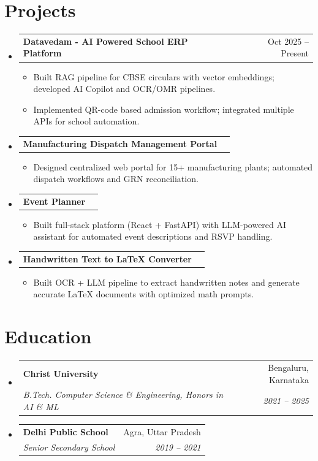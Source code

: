 \documentclass[letterpaper,10pt]{article}
\makeatletter
\newcommand{\resumeItem}[1]{
  \item\small{
    {#1 \vspace{-1pt}}
  }
}
\newcommand{\resumeSubheading}[4]{
  \vspace{-1pt}\item
    \begin{tabular*}{0.97\textwidth}[t]{l@{\extracolsep{\fill}}r}
      \textbf{#1} & #2 \\
      \textit{\small #3} & \textit{\small #4} \\
    \end{tabular*}\vspace{-5pt}
}
\newcommand{\resumeProjectHeading}[2]{
    \item
    \begin{tabular*}{0.97\textwidth}{l@{\extracolsep{\fill}}r}
      \small#1 & #2 \\
    \end{tabular*}\vspace{-1pt}
}
\newcommand{\resumeSubHeadingListStart}{\begin{itemize}[leftmargin=0.15in, label={}]}
\newcommand{\resumeSubHeadingListEnd}{\end{itemize}\vspace{-5pt}}
\newcommand{\resumeItemListStart}{\begin{itemize}\vspace{-3pt}}
\newcommand{\resumeItemListEnd}{\end{itemize}\vspace{-2pt}}
\makeatother
\begin{document}
\section{Projects}
\resumeSubHeadingListStart
    \resumeProjectHeading
      {\textbf{Datavedam - AI Powered School ERP Platform}}{Oct 2025 -- Present}
      \resumeItemListStart
        \resumeItem{Built RAG pipeline for CBSE circulars with vector embeddings; developed AI Copilot and OCR/OMR pipelines.}
        \resumeItem{Implemented QR-code based admission workflow; integrated multiple APIs for school automation.}
      \resumeItemListEnd
    \resumeProjectHeading
      {\textbf{Manufacturing Dispatch Management Portal}}{}
      \resumeItemListStart
        \resumeItem{Designed centralized web portal for 15+ manufacturing plants; automated dispatch workflows and GRN reconciliation.}
      \resumeItemListEnd
    \resumeProjectHeading
      {\textbf{Event Planner}}{}
      \resumeItemListStart
        \resumeItem{Built full-stack platform (React + FastAPI) with LLM-powered AI assistant for automated event descriptions and RSVP handling.}
      \resumeItemListEnd
    \resumeProjectHeading
      {\textbf{Handwritten Text to LaTeX Converter}}{}
      \resumeItemListStart
        \resumeItem{Built OCR + LLM pipeline to extract handwritten notes and generate accurate LaTeX documents with optimized math prompts.}
      \resumeItemListEnd
\resumeSubHeadingListEnd

\section{Education}
\resumeSubHeadingListStart
    \resumeSubheading
      {Christ University}{Bengaluru, Karnataka}
      {B.Tech. Computer Science \& Engineering, Honors in AI \& ML}{2021 -- 2025}
    \resumeSubheading
      {Delhi Public School}{Agra, Uttar Pradesh}
      {Senior Secondary School}{2019 -- 2021}
\resumeSubHeadingListEnd
\end{document}
